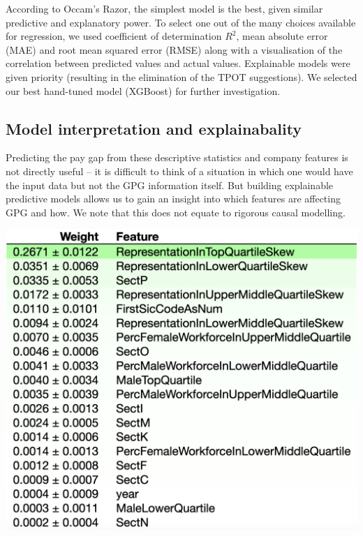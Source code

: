 According to Occam’s Razor, the simplest model is the best, given similar predictive and explanatory power. To select one out of the many choices available for regression, we used coefficient of determination $R^2$, mean absolute error (MAE) and root mean squared error (RMSE) along with a visualisation of the correlation between predicted values and actual values. Explainable models were given priority (resulting in the elimination of the TPOT suggestions). 
We selected our best hand-tuned model (XGBoost) for further investigation.



\subsection{Model interpretation and explainabality}
Predicting the pay gap from these descriptive statistics and company features is
not directly useful -- it is difficult to think of a situation in which one would have the input data but not the GPG information itself. But building explainable predictive models allows us to gain an insight into which features are affecting GPG and how. We note that this does not equate to rigorous causal modelling.

\begin{centering}
    \includegraphics[width=0.99\linewidth]{images/PI-with-extra-features.png}
    \label{fig:median-rf-pi}
\end{centering}


